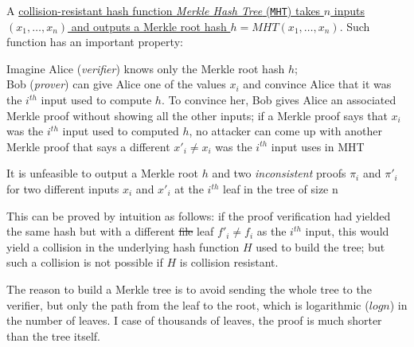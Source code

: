 A \ul{collision-resistant hash function \textit{Merkle Hash Tree} (\texttt{MHT}) takes $n$ inputs $(x_1,\dots,x_n)$ and outputs a Merkle root hash $h=MHT(x_1,\dots,x_n)$}. Such function has an important property:
\begin{center}
   Imagine Alice (\textit{verifier}) knows only the Merkle root hash $h$;\\
   Bob (\textit{prover}) can give Alice one of the values $x_i$ and convince Alice that it was the $i^{th}$ input used to compute $h$.
   To convince her, Bob gives Alice an associated Merkle proof without
   showing all the other inputs;
   if a Merkle proof says that $x_i$ was the $i^{th}$ input used to computed $h$, no attacker can come up with another Merkle proof that says a different $x'_i\neq x_i$ was the $i^{th}$ input uses in MHT
\end{center}
\begin{definition}
   It is unfeasible to output a Merkle root $h$ and two \textit{inconsistent} proofs $\pi_i$ and
   $\pi'_i$ for two different inputs $x_i$ and $x'_i$ at the $i^{th}$ leaf in the tree of size n
\end{definition}
This can be proved by intuition as follows:
if the proof verification had yielded the same hash but with a different \st{file} leaf
$f'_i\neq f_i$ as the $i^{th}$ input, this would yield a collision in the underlying hash function
$H$ used to build the tree; but such a collision is not possible if $H$ is collision resistant.

The reason to build a Merkle tree is to avoid sending the whole tree to the verifier, but only the path from the leaf to the root, which is logarithmic ($log n$) in the number of leaves.
I case of thousands of leaves, the proof is much shorter than the tree itself.

